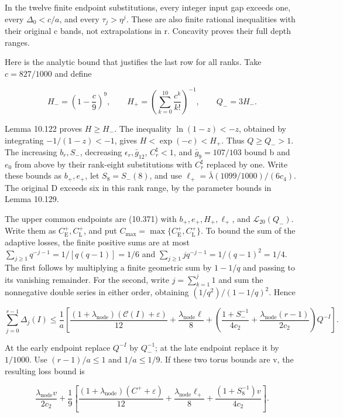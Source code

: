 \documentclass[
  11pt,
  a4paper,
]{article}
\begin{document}
In the twelve finite endpoint substitutions, every integer input gap
exceeds one, every \(\Delta_0<c/a\), and every \(\tau_j>\eta^j\). These
are also finite rational inequalities with their original c bands, not
extrapolations in r. Concavity proves their full depth ranges.

Here is the analytic bound that justifies the last row for all ranks.
Take \(c=827/1000\) and define

\[
H_-=\left(1-\frac c9\right)^9,\qquad
H_+=\left(\sum_{k=0}^{10}\frac{c^k}{k!}\right)^{-1},\qquad Q_-=3H_-.
\tag{10.372}
\]

Lemma 10.122 proves \(H\ge H_-\). The inequality \(\ln(1-z)<-z\),
obtained by integrating \(-1/(1-z)<-1\), gives \(H<\exp(-c)<H_+\). Thus
\(Q\ge Q_->1\). The increasing \(b_r,S_-\), decreasing
\(\epsilon_r,\bar g_{12}\), \(C_r^{\sharp}<1\), and \(\bar g_9=107/103\)
bound b and \(e_0\) from above by their rank-eight substitutions with
\(C_r^{\sharp}\) replaced by one. Write these bounds as \(b_+,e_+\), let
\(S_8=S_-(8)\), and use \(\ell_+=\bar\lambda(1099/1000)/(6c_4)\). The
original D exceeds six in this rank range, by the parameter bounds in
Lemma 10.129.

The upper common endpoints are (10.371) with \(b_+,e_+,H_+,\ell_+\), and
\(\mathcal L_{20}(Q_-)\). Write them as
\(C_{\mathrm E}^+,C_{\mathrm L}^+\), and put
\(C_{\max}=\max\{C_{\mathrm E}^+,C_{\mathrm L}^+\}\). To bound the sum
of the adaptive losses, the finite positive sums are at most
\(\sum_{j\ge1}q^{-j-1}=1/[q(q-1)]=1/6\) and
\(\sum_{j\ge1}j q^{-j-1}=1/(q-1)^2=1/4\). The first follows by
multiplying a finite geometric sum by \(1-1/q\) and passing to its
vanishing remainder. For the second, write \(j=\sum_{k=1}^j1\) and sum
the nonnegative double series in either order, obtaining
\((1/q^2)/(1-1/q)^2\). Hence

\[
\sum_{j=0}^{r-1}\Delta_j(I)\le\frac1a
\left[\frac{(1+\lambda_{\mathrm{node}})(\mathcal C(I)+\varepsilon)}{12}
+\frac{\lambda_{\mathrm{node}}\ell}{8}
+\left(\frac{1+S_-^{-1}}{4c_2}
+\frac{\lambda_{\mathrm{node}}(r-1)}{2c_2}\right)Q^{-I}\right].
\tag{10.373}
\]

At the early endpoint replace \(Q^{-I}\) by \(Q_-^{-1}\); at the late
endpoint replace it by \(1/1000\). Use \((r-1)/a\le1\) and
\(1/a\le1/9\). If these two torus bounds are v, the resulting loss bound
is

\[
\frac{\lambda_{\mathrm{node}}v}{2c_2}
+\frac19\left[
\frac{(1+\lambda_{\mathrm{node}})(C^++\varepsilon)}{12}
+\frac{\lambda_{\mathrm{node}}\ell_+}{8}
+\frac{(1+S_8^{-1})v}{4c_2}\right].
\tag{10.374}
\]
\end{document}
